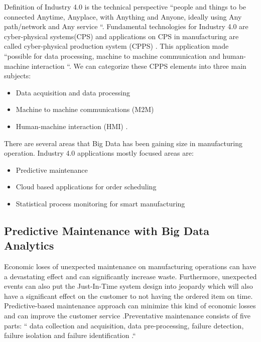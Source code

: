 \documentclass[sigconf]{acmart}
\begin{document}
\par Definition of Industry 4.0 is the technical perspective ``people and things to be connected Anytime, Anyplace, with Anything and Anyone, ideally using Any path/network and Any service \cite{saint-exupery}``. Fundamental technologies for Industry 4.0 are cyber-physical systems(CPS) and applications on CPS in manufacturing are called cyber-physical production system (CPPS) \cite{WAGNER2017125}. This application made ``possible for data processing, machine to machine communication and human-machine interaction \cite{WAGNER2017125}``. We can categorize these CPPS elements into three main subjects:

\begin{itemize}
    \item Data acquisition and data processing
    \item Machine to machine communications (M2M)
    \item Human-machine interaction (HMI) \cite{WAGNER2017125}.
\end{itemize}

\par There are several areas that Big Data has been gaining size in manufacturing operation. Industry 4.0 applications mostly focused areas are:

\begin{itemize}
    \item Predictive maintenance \cite{KUMAR2017}
    \item Cloud based applications for order scheduling \cite{RUDOLPH2017412}
    \item Statistical process monitoring for smart manufacturing \cite{HE2017} 
\end{itemize}


\subsection{Predictive Maintenance with Big Data Analytics}
Economic loses of unexpected maintenance on manufacturing operations can have a devastating effect and can significantly increase waste. Furthermore, unexpected events can also put the Just-In-Time system design into jeopardy which will also have a significant effect on the customer to not having the ordered item on time. Predictive-based maintenance approach can minimize this kind of economic losses and can improve the customer service \cite{KUMAR2017}.Preventative maintenance consists of five parts: `` data collection and acquisition, data pre-processing, failure detection, failure isolation and failure identification \cite{KUMAR2017}.``
\end{document}
